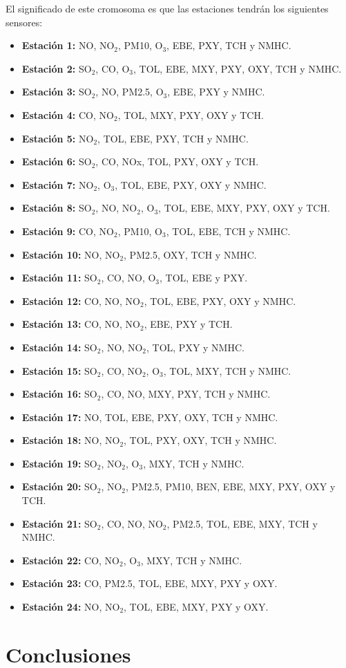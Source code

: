 \documentclass[12pt, spanish, pdftex]{UC3M_document}
\begin{document}
El significado de este cromosoma es que las estaciones tendrán los siguientes sensores:
\begin{itemize}
	\item \textbf{Estación 1:} NO, NO$_2$, PM10, O$_3$, EBE, PXY, TCH y NMHC.
	\item \textbf{Estación 2:} SO$_2$, CO, O$_3$, TOL, EBE, MXY, PXY, OXY, TCH y NMHC.
	\item \textbf{Estación 3:} SO$_2$, NO, PM2.5, O$_3$, EBE, PXY y NMHC.
	\item \textbf{Estación 4:} CO, NO$_2$, TOL, MXY, PXY, OXY y TCH.
	\item \textbf{Estación 5:} NO$_2$, TOL, EBE, PXY, TCH y NMHC.
	\item \textbf{Estación 6:} SO$_2$, CO, NOx, TOL, PXY, OXY y TCH.
	\item \textbf{Estación 7:} NO$_2$, O$_3$, TOL, EBE, PXY, OXY y NMHC.
	\item \textbf{Estación 8:} SO$_2$, NO, NO$_2$, O$_3$, TOL, EBE, MXY, PXY, OXY y TCH.
	\item \textbf{Estación 9:} CO, NO$_2$, PM10, O$_3$, TOL, EBE, TCH y NMHC.
	\item \textbf{Estación 10:} NO, NO$_2$, PM2.5, OXY, TCH y NMHC.
	\item \textbf{Estación 11:} SO$_2$, CO, NO, O$_3$, TOL, EBE y PXY.
	\item \textbf{Estación 12:} CO, NO, NO$_2$, TOL, EBE, PXY, OXY y NMHC.
	\item \textbf{Estación 13:} CO, NO, NO$_2$, EBE, PXY y TCH.
	\item \textbf{Estación 14:} SO$_2$, NO, NO$_2$, TOL, PXY y NMHC.
	\item \textbf{Estación 15:} SO$_2$, CO, NO$_2$, O$_3$, TOL, MXY, TCH y NMHC.
	\item \textbf{Estación 16:} SO$_2$, CO, NO, MXY, PXY, TCH y NMHC.
	\item \textbf{Estación 17:} NO, TOL, EBE, PXY, OXY, TCH y NMHC.
	\item \textbf{Estación 18:} NO, NO$_2$, TOL, PXY, OXY, TCH y NMHC.
	\item \textbf{Estación 19:} SO$_2$, NO$_2$, O$_3$, MXY, TCH y NMHC.
	\item \textbf{Estación 20:} SO$_2$, NO$_2$, PM2.5, PM10, BEN, EBE, MXY, PXY, OXY y TCH.
	\item \textbf{Estación 21:} SO$_2$, CO, NO, NO$_2$, PM2.5, TOL, EBE, MXY, TCH y NMHC.
	\item \textbf{Estación 22:} CO, NO$_2$, O$_3$, MXY, TCH y NMHC.
	\item \textbf{Estación 23:} CO, PM2.5, TOL, EBE, MXY, PXY y OXY.
	\item \textbf{Estación 24:} NO, NO$_2$, TOL, EBE, MXY, PXY y OXY.
\end{itemize}

\section{Conclusiones}
\end{document}
